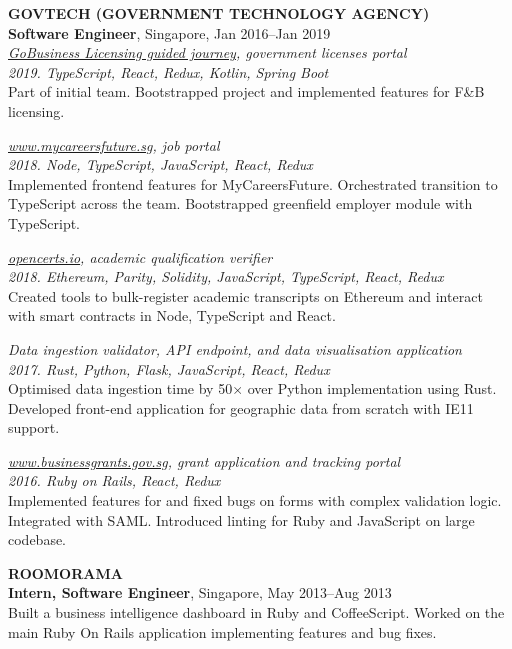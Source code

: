 \documentclass[line, margin]{res}
\begin{document}
\begin{resume}
        \textbf{GOVTECH (GOVERNMENT TECHNOLOGY AGENCY)} \\
        \textbf{Software Engineer}, Singapore, Jan 2016--Jan 2019
        \\
        \textit{\href{https://www.gobusiness.gov.sg/licences/foodservices}{GoBusiness Licensing guided journey}, government licenses portal} \\
        \textit{2019. TypeScript, React, Redux, Kotlin, Spring Boot} \\
        Part of initial team. Bootstrapped project and implemented features for F\&B licensing.
        
        \textit{\href{https://www.mycareersfuture.sg}{www.mycareersfuture.sg}, job portal} \\
        \textit{2018. Node, TypeScript, JavaScript, React, Redux} \\
        Implemented frontend features for MyCareersFuture. Orchestrated transition to TypeScript across the team. Bootstrapped greenfield employer module with TypeScript.

        \textit{\href{https://opencerts.io/}{opencerts.io}, academic qualification verifier} \\
        \textit{2018. Ethereum, Parity, Solidity, JavaScript, TypeScript, React, Redux} \\
        Created tools to bulk-register academic transcripts on Ethereum and interact with smart contracts in Node, TypeScript and React.

        \textit{Data ingestion validator, API endpoint, and data visualisation application} \\
        \textit{2017. Rust, Python, Flask, JavaScript, React, Redux} \\
        Optimised data ingestion time by 50$\times$ over Python implementation using Rust.
        Developed front-end application for geographic data from scratch with IE11 support.

        \textit{\href{https://www.businessgrants.gov.sg/}{www.businessgrants.gov.sg}, grant application and tracking portal} \\
        \textit{2016. Ruby on Rails, React, Redux} \\
        Implemented features for and fixed bugs on forms with complex validation logic.
        Integrated with SAML.
        Introduced linting for Ruby and JavaScript on large codebase.

        \pagebreak

        \textbf{ROOMORAMA} \\
        \textbf{Intern, Software Engineer}, Singapore, May 2013--Aug 2013 \\
        Built a business intelligence dashboard in Ruby and CoffeeScript. Worked on the main Ruby On Rails application implementing features and bug fixes.


\end{resume}
\end{document}
